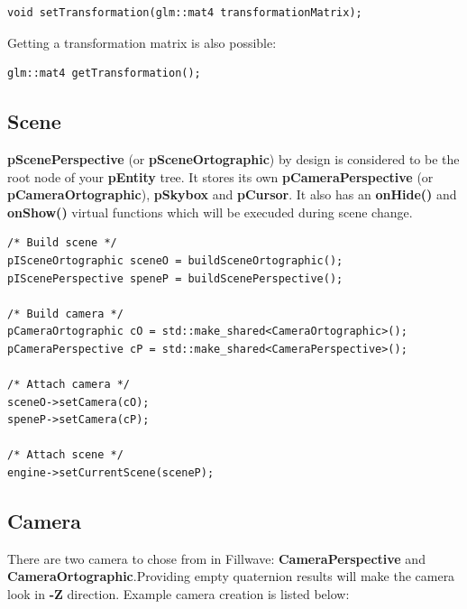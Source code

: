 \documentclass{article}
\begin{document}
\begin{lstlisting}
void setTransformation(glm::mat4 transformationMatrix);
\end{lstlisting}

\indent \indent Getting a transformation matrix is also possible:

\begin{lstlisting}
glm::mat4 getTransformation();
\end{lstlisting}

\subsection{Scene}\label{sec:Scene}
\indent \indent \textbf{pScenePerspective} (or \textbf{pSceneOrtographic}) by design is considered to be the root node of your \textbf{pEntity} tree. It stores its own \textbf{pCameraPerspective} (or \textbf{pCameraOrtographic}), \textbf{pSkybox} and \textbf{pCursor}. It also has an \textbf{onHide()} and \textbf{onShow()} virtual functions which will be execuded during scene change.

\begin{lstlisting}
/* Build scene */
pISceneOrtographic sceneO = buildSceneOrtographic();
pIScenePerspective speneP = buildScenePerspective();

/* Build camera */
pCameraOrtographic cO = std::make_shared<CameraOrtographic>();
pCameraPerspective cP = std::make_shared<CameraPerspective>();

/* Attach camera */
sceneO->setCamera(cO);
speneP->setCamera(cP);

/* Attach scene */
engine->setCurrentScene(sceneP);

\end{lstlisting}

\subsection{Camera}\label{sec:Camera}

\indent \indent There are two camera to chose from in Fillwave: \textbf{CameraPerspective} and \textbf{CameraOrtographic}.Providing empty quaternion results will make the camera look in \textbf{-Z} direction. Example camera creation is listed below:
\end{document}
